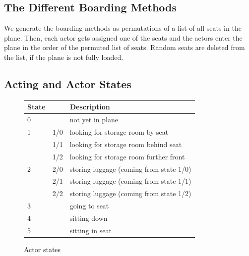 \documentclass[11pt]{article}
\begin{document}
\subsection{The Different Boarding Methods}
We generate the boarding methods as permutations of a list of all seats in the plane. Then, each actor gets assigned one of the seats and the actors enter the plane in the order of the permuted list of seats. Random seats are deleted from the list, if the plane is not fully loaded.

\subsection{Acting and Actor States}
\begin{figure}[h!]
	\center
\begin{tabular}{|ll|l|}
	\hline
	State & &Description\\
	\hline
0 &     & not yet in plane                        \\
\hline
1 & 1/0 & looking for storage room by seat        \\
  & 1/1 & looking for storage room behind seat    \\
  & 1/2 & looking for storage room further front  \\
  \hline
2 & 2/0 & storing luggage (coming from state 1/0) \\
  & 2/1 & storing luggage (coming from state 1/1) \\
  & 2/2 & storing luggage (coming from state 1/2) \\
  \hline
3 &     & going to seat                           \\
\hline
4 &     & sitting down                            \\
\hline
5 &     & sitting in seat       \\                 
\hline

\end{tabular}
\caption{Actor states}
\label{tab:states}
\end{figure}
\end{document}
